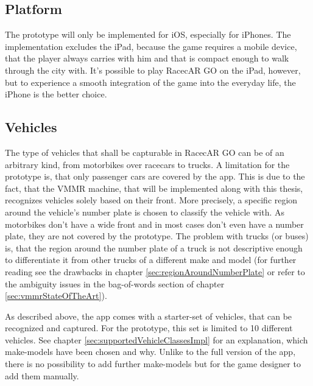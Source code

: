 \subsection{Platform}
The prototype will only be implemented for iOS, especially for iPhones. The implementation excludes the iPad, because the game requires a mobile device, that the player always carries with him and that is compact enough to walk through the city with. It's possible to play RacecAR GO on the iPad, however, but to experience a smooth integration of the game into the everyday life, the iPhone is the better choice.

\subsection{Vehicles}
The type of vehicles that shall be capturable in RacecAR GO can be of an arbitrary kind, from motorbikes over racecars to trucks. A limitation for the prototype is, that only passenger cars are covered by the app. This is due to the fact, that the VMMR machine, that will be implemented along with this thesis, recognizes vehicles solely based on their front. More precisely, a specific region around the vehicle's number plate is chosen to classify the vehicle with. As motorbikes don't have a wide front and in most cases don't even have a number plate, they are not covered by the prototype. The problem with trucks (or buses) is, that the region around the number plate of a truck is not descriptive enough to differentiate it from other trucks of a different make and model (for further reading see the drawbacks in chapter \ref{sec:regionAroundNumberPlate} or refer to the ambiguity issues in the bag-of-words section of chapter \ref{sec:vmmrStateOfTheArt}).

As described above, the app comes with a starter-set of vehicles, that can be recognized and captured. For the prototype, this set is limited to 10 different vehicles. See chapter \ref{sec:supportedVehicleClassesImpl} for an explanation, which make-models have been chosen and why. Unlike to the full version of the app, there is no possibility to add further make-models but for the game designer to add them manually.

